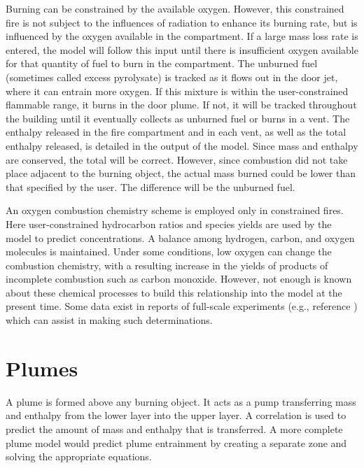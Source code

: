 Burning can be constrained by the available oxygen.  However, this constrained fire is not subject to the influences of radiation to enhance its burning rate, but is influenced by the oxygen available in the compartment.  If a large mass loss rate is entered, the model will follow this input until there is insufficient oxygen available for that quantity of fuel to burn in the compartment.  The unburned fuel (sometimes called excess pyrolysate) is tracked as it flows out in the door jet, where it can entrain more oxygen.  If this mixture is within the user-constrained flammable range, it burns in the door plume.  If not, it will be tracked throughout the building until it eventually collects as unburned fuel or burns in a vent.  The enthalpy released in the fire compartment and in each vent, as well as the total enthalpy released, is detailed in the output of the model.  Since mass and enthalpy are conserved, the total will be correct.  However, since combustion did not take place adjacent to the burning object, the actual mass burned could be lower than that specified by the user.  The difference will be the unburned fuel.

An oxygen combustion chemistry scheme is employed only in constrained fires.  Here user-constrained hydrocarbon ratios and species yields are used by the model to predict concentrations.  A balance among hydrogen, carbon, and oxygen molecules is maintained.  Under some conditions, low oxygen can change the combustion chemistry, with a resulting increase in the yields of products of incomplete combustion such as carbon monoxide. However, not enough is known about these chemical processes to build this relationship into the model at the present time.  Some data exist in reports of full-scale experiments (e.g., reference \cite{Lee:1982}) which can assist in making such determinations.

\section{Plumes}

A plume is formed above any burning object.  It acts as a pump transferring mass and enthalpy from the lower layer into the upper layer.  A correlation is used to predict the amount of mass and enthalpy that is transferred.  A more complete plume model would predict plume entrainment by creating a separate zone and solving the appropriate equations.

